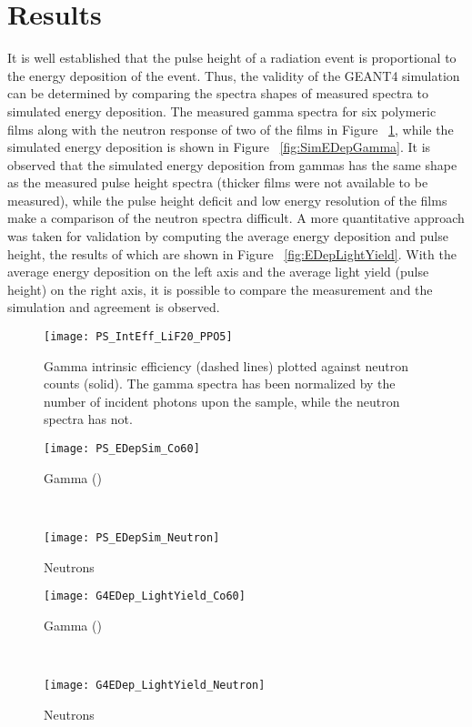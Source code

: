 \documentclass[draftcls,onecolumn]{IEEEtran}
\begin{document}
\section{Results}
\label{sec:Results}
It is well established that the pulse height of a radiation event is proportional to the energy deposition of the event\cite{birks_scintillations_1951}.
Thus, the validity of the GEANT4 simulation can be determined by comparing the spectra shapes of measured spectra to simulated energy deposition.
The measured gamma spectra for six polymeric films along with the neutron response of two of the films in Figure ~\ref{fig:GammaIntrNeutronCounts}, while the simulated energy deposition is shown in Figure ~\ref{fig:SimEDepGamma}.
It is observed that the simulated energy deposition from gammas has the same shape as the measured pulse height spectra (thicker films were not available to be measured), while the pulse height deficit and low energy resolution of the films make a comparison of the neutron spectra difficult.
A more quantitative approach was taken for validation by computing the average energy deposition and pulse height, the results of which are shown in Figure ~\ref{fig:EDepLightYield}. 
With the average energy deposition on the left axis and the average light yield (pulse height) on the right axis, it is possible to compare the measurement and the simulation and agreement is observed.
\begin{figure}[h]
    \centering
    \texttt{[image: PS\_IntEff\_LiF20\_PPO5]}
    \caption{Gamma intrinsic efficiency (dashed lines) plotted against neutron counts (solid). The gamma spectra has been normalized by the number of incident photons upon the sample, while the neutron spectra has not.}
    \label{fig:GammaIntrNeutronCounts}
\end{figure}
\begin{figure*}[h]
	\centering
	\begin{subfigure}[b]{0.45\figurewidth}
    		\texttt{[image: PS\_EDepSim\_Co60]}
		\caption{Gamma ()}
	\end{subfigure}%
	~
	\begin{subfigure}[b]{0.45\figurewidth}
    		\texttt{[image: PS\_EDepSim\_Neutron]}
		\caption{Neutrons}
	\end{subfigure}%
	\caption{Simulated Energy Deposition}
	\label{fig:SimEDepGamma}
\end{figure*}
\begin{figure*}[!ht]
	\centering
	\begin{subfigure}[b]{0.45\figurewidth}
    		\texttt{[image: G4EDep\_LightYield\_Co60]}
		\caption{Gamma ()}
	\end{subfigure}%
	~
	\begin{subfigure}[b]{0.45\figurewidth}
    		\texttt{[image: G4EDep\_LightYield\_Neutron]}
		\caption{Neutrons}
	\end{subfigure}%
	\caption{Average Energy Deposition and Measured Light Yield}
	\label{fig:EDepLightYield}
\end{figure*}
\end{document}

